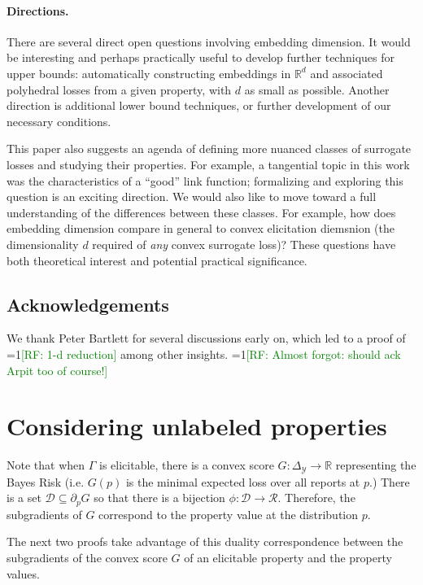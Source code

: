 \documentclass[anon,12pt]{colt2019}
\newcommand{\Comments}{1}
\newcommand{\mynote}[2]{\ifnum\Comments=1\textcolor{#1}{#2}\fi}
\newcommand{\raf}[1]{\mynote{green}{[RF: #1]}}
\newcommand{\reals}{\mathbb{R}}
\newcommand{\simplex}{\Delta_\Y}
\newcommand{\D}{\mathcal{D}}
\newcommand{\R}{\mathcal{R}}
\newcommand{\Y}{\mathcal{Y}}
\begin{document}
\paragraph{Directions.}
There are several direct open questions involving embedding dimension.
It would be interesting and perhaps practically useful to develop further techniques for upper bounds: automatically constructing embeddings in $\reals^d$ and associated polyhedral losses from a given property, with $d$ as small as possible.
Another direction is additional lower bound techniques, or further development of our necessary conditions.

This paper also suggests an agenda of defining more nuanced classes of surrogate losses and studying their properties.
For example, a tangential topic in this work was the characteristics of a ``good'' link function; formalizing and exploring this question is an exciting direction.
We would also like to move toward a full understanding of the differences between these classes.
For example, how does embedding dimension compare in general to convex elicitation diemsnion (the dimensionality $d$ required of \emph{any} convex surrogate loss)?
These questions have both theoretical interest and potential practical significance.

\subsection*{Acknowledgements}
We thank Peter Bartlett for several discussions early on, which led to a proof of \raf{1-d reduction} among other insights.
\raf{Almost forgot: should ack Arpit too of course!}



\appendix

\section{Considering unlabeled properties}
  Note that when $\Gamma$ is elicitable, there is a convex score $G:\simplex \to \reals$ representing the Bayes Risk (i.e. $G(p)$ is the minimal expected loss over all reports at $p$.)
  There is a set $\D \subseteq \partial_p G$ so that there is a bijection $\phi:\D \to \R$.
  Therefore, the subgradients of $G$ correspond to the property value at the distribution $p$.

  The next two proofs take advantage of this duality correspondence between the subgradients of the convex score $G$ of an elicitable property and the property values.
\end{document}
